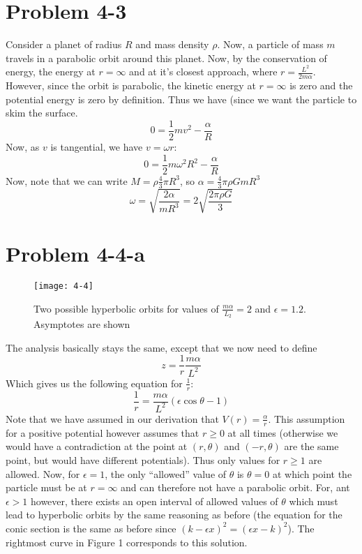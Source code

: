 \section*{Problem 4-3}
Consider a planet of radius $R$ and mass density $\rho$. Now, a particle of mass $m$ travels in a parabolic orbit around this planet. Now, by the conservation of energy, the energy at $r=\infty$ and at it's closest approach, where $r = \frac{L^2}{2m\alpha}$. However, since the orbit is parabolic, the kinetic energy at $r=\infty$ is zero and the potential energy is zero by definition. Thus we have (since we want the particle to skim the surface. 
\[ 0 = \frac{1}{2}m v^2 -  \frac{\alpha}{R}\]
Now, as $v$ is tangential, we have $v=\omega r$:
\[ 0 = \frac{1}{2}m \omega^2 R^2 -  \frac{\alpha}{R} \]
Now, note that we can write $M=\rho \frac{4}{3}\pi R^3$, so $\alpha=\frac{4}{3}\pi \rho G m R^3$
\[ \omega = \sqrt{\frac{2\alpha}{mR^3}} = 2\sqrt{\frac{2\pi \rho G}{3}} \]
\section*{Problem 4-4-a}
\begin{wrapfigure}{r}{0.5\textwidth}
\texttt{[image: 4-4]}
\label{fig:2-1-a}
\caption{Two possible hyperbolic orbits for values of $\frac{m\alpha}{L_2}=2$ and $\epsilon=1.2$. Asymptotes are shown}
\vspace{40pt}
\end{wrapfigure}
The analysis basically stays the same, except that we now need to define 
\[ z = \frac{1}{r} \frac{m\alpha}{L^2} \]
Which gives us the following equation for $\frac{1}{r}$:
\[ \frac{1}{r} = \frac{m\alpha}{L^2} (\epsilon \cos\theta - 1) \]
Note that we have assumed in our derivation that $V(r) = \frac{\alpha}{r}$. This assumption for a positive potential however assumes that $r\geq 0$ at all times (otherwise we would have a contradiction at the point at $(r,\theta)$ and $(-r,\theta)$ are the same point, but would have different potentials). Thus only values for $r\geq 1$ are allowed. Now, for $\epsilon=1$, the only ``allowed'' value of $\theta$ is $\theta=0$ at which point the particle must be at $r=\infty$ and can therefore not have a parabolic orbit. For, ant $\epsilon>1$ however, there exists an open interval of allowed values of $\theta$ which must lead to hyperbolic orbits by the same reasoning as before (the equation for the conic section is the same as before since $(k-\epsilon x)^2=(\epsilon x-k)^2$).  The rightmost curve in Figure 1 corresponds to this solution. 
